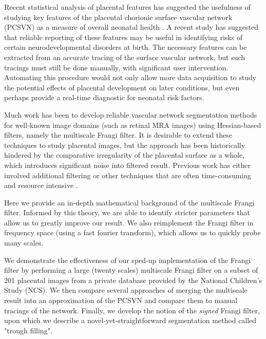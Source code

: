 

Recent statistical analysis of placental features has suggested the usefulness
of studying key features of the placental chorionic surface vascular network
(PCSVN) as a measure of overall neonatal health \cite{chang2017}. A recent
study has suggested that reliable reporting of these features may be useful in
identifying risks of certain neurodevelopmental disorders at birth. The
necessary features can be extracted from an accurate tracing of the surface
vascular network, but such tracings must still be done manually, with
significant user intervention. Automating this procedure would not only allow
more data acquisition to study the potential effects of placental development on
later conditions, but even perhaps provide a real-time diagnostic for neonatal
risk factors.

Much work has been to develop reliable vascular network segmentation methods for
well-known image domains (such as retinal MRA images) using Hessian-based
filters, namely the multiscale Frangi filter. It is desirable to extend these
techniques to study placental images, but the approach has been historically
hindered by the comparative irregularity of the placental surface as a whole,
which introduces significant noise into filtered result.  Previous work has either
involved additional filtering \cite{huynh2013filter} or other techniques that are
often time-consuming and resource intensive \cite{djima2017enhancing}.

Here we provide an in-depth mathematical background of the multiscale Frangi filter.
Informed by this theory, we are able to identify stricter parameters that allow us
to greatly improve our result. We also reimplement the Frangi filter in frequency space
(using a fast fourier transform), which allows us to quickly probe many scales.

We demonstrate the effectiveness of our sped-up implementation of the Frangi
filter by performing a large (twenty scales) multiscale Frangi filter on a subset of 201
placental images from a private database provided by the National Children's
Study (NCS). We then compare several approaches of merging the multiscale
result into an approximation of the PCSVN and compare them to manual tracings
of the network. Finally, we develop the notion of the \textit{signed} Frangi filter,
upon which we describe a novel-yet-straightforward segmentation method called "trough filling".


